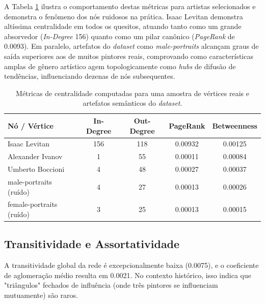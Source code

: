 \documentclass[12pt,a4paper]{article}
\begin{document}
A Tabela \ref{tab:centralidades} ilustra o comportamento destas métricas para artistas selecionados e demonstra o fenômeno dos nós ruidosos na prática. Isaac Levitan demonstra altíssima centralidade em todos os quesitos, atuando tanto como um grande absorvedor (\textit{In-Degree} 156) quanto como um pilar canônico (\textit{PageRank} de 0.0093). Em paralelo, artefatos do \textit{dataset} como \textit{male-portraits} alcançam graus de saída superiores aos de muitos pintores reais, comprovando como características amplas de gênero artístico agem topologicamente como \textit{hubs} de difusão de tendências, influenciando dezenas de nós subsequentes.

\begin{table}[htpb]
    \centering
    \caption{Métricas de centralidade computadas para uma amostra de vértices reais e artefatos semânticos do \textit{dataset}.}
    \label{tab:centralidades}
    \begin{tabular}{@{}lcccc@{}}
        \toprule
        \textbf{Nó / Vértice}    & \textbf{In-Degree} & \textbf{Out-Degree} & \textbf{PageRank} & \textbf{Betweenness} \\ \midrule
        Isaac Levitan            & 156                & 118                 & 0.00932           & 0.00125              \\
        Alexander Ivanov         & 1                  & 55                  & 0.00011           & 0.00084              \\
        Umberto Boccioni         & 4                  & 48                  & 0.00027           & 0.00037              \\
        male-portraits (ruído)   & 4                  & 27                  & 0.00013           & 0.00026              \\
        female-portraits (ruído) & 3                  & 25                  & 0.00013           & 0.00015              \\ \bottomrule
    \end{tabular}
\end{table}

\subsection{Transitividade e Assortatividade}

A transitividade global da rede é excepcionalmente baixa (0.0075), e o coeficiente de aglomeração médio resulta em 0.0021. No contexto histórico, isso indica que "triângulos" fechados de influência (onde três pintores se influenciam mutuamente) são raros.
\end{document}
